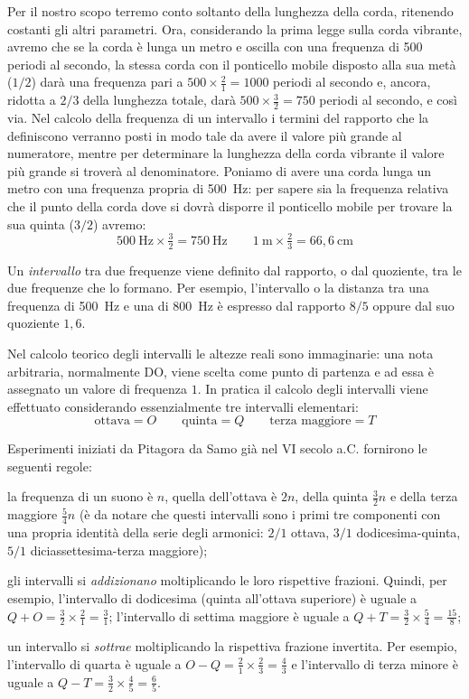 Per il nostro scopo terremo conto soltanto della lunghezza della corda,
ritenendo costanti gli altri parametri. Ora, considerando la prima legge sulla
corda vibrante, avremo che se la corda è lunga un metro e oscilla con una
frequenza di 500 periodi al secondo, la stessa corda con il ponticello mobile
disposto alla sua metà ($1/2$) darà una frequenza pari a
$500 \times \frac{2}{1} = 1000$ periodi al secondo e, ancora, ridotta a $2/3$
della lunghezza totale, darà $500 \times \frac{3}{2} = 750$ periodi al secondo,
e così via. Nel calcolo della frequenza di un intervallo i termini del rapporto
che la definiscono verranno posti in modo tale da avere il valore più grande al
numeratore, mentre per determinare la lunghezza della corda vibrante il valore
più grande si troverà al denominatore. Poniamo di avere una corda lunga un metro
con una frequenza propria di 500~Hz: per sapere sia la frequenza relativa che il
punto della corda dove si dovrà disporre il ponticello mobile per trovare la sua
quinta ($3/2$) avremo:
\[
  500~\text{Hz} \times \tfrac{3}{2} = 750~\text{Hz}
  \qquad
  1~\text{m} \times \tfrac{2}{3} = 66{,}6~\text{cm}
\]

Un \emph{intervallo} tra due frequenze viene definito dal rapporto, o dal
quoziente, tra le due frequenze che lo formano. Per esempio, l'intervallo o la
distanza tra una frequenza di 500~Hz e una di 800~Hz è espresso dal rapporto
$8/5$ oppure dal suo quoziente $1{,}6$.

Nel calcolo teorico degli intervalli le altezze reali sono immaginarie: una nota
arbitraria, normalmente DO, viene scelta come punto di partenza e ad essa è
assegnato un valore di frequenza $1$. In pratica il calcolo degli intervalli
viene effettuato considerando essenzialmente tre intervalli elementari:
\[
  \text{ottava} = O \qquad
  \text{quinta} = Q \qquad
  \text{terza maggiore} = T
\]

Esperimenti iniziati da Pitagora da Samo già nel VI secolo a.C. fornirono le
seguenti regole:

\begin{elenco}
  \item la frequenza di un suono è $n$, quella dell'ottava è $2n$, della quinta
        $\frac{3}{2}n$ e della terza maggiore $\frac{5}{4}n$ (è da notare che
        questi intervalli sono i primi tre componenti con una propria identità
        della serie degli armonici: $2/1$ ottava, $3/1$ dodicesima-quinta,
        $5/1$ diciassettesima-terza maggiore);
  \item gli intervalli si \emph{addizionano} moltiplicando le loro rispettive
        frazioni. Quindi, per esempio, l'intervallo di dodicesima (quinta
        all'ottava superiore) è uguale a
        $Q + O = \frac{3}{2} \times \frac{2}{1} = \frac{3}{1}$;
        l'intervallo di settima maggiore è uguale a
        $Q + T = \frac{3}{2} \times \frac{5}{4} = \frac{15}{8}$;
  \item un intervallo si \emph{sottrae} moltiplicando la rispettiva frazione
        invertita. Per esempio, l'intervallo di quarta è uguale a
        $O - Q = \frac{2}{1} \times \frac{2}{3} = \frac{4}{3}$ e l'intervallo di
        terza minore è uguale a
        $Q - T = \frac{3}{2} \times \frac{4}{5} = \frac{6}{5}$.
\end{elenco}

